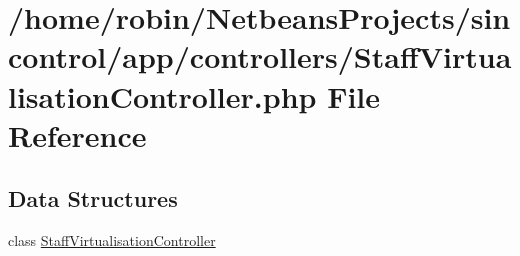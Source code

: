 \hypertarget{_staff_virtualisation_controller_8php}{}\section{/home/robin/\+Netbeans\+Projects/sincontrol/app/controllers/\+Staff\+Virtualisation\+Controller.php File Reference}
\label{_staff_virtualisation_controller_8php}
\subsection*{Data Structures}
\begin{DoxyCompactItemize}
\item 
class \hyperlink{class_staff_virtualisation_controller}{Staff\+Virtualisation\+Controller}
\end{DoxyCompactItemize}
